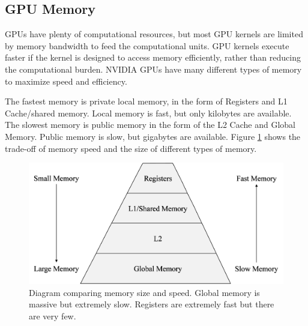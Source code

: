 \subsection{GPU Memory}
\label{sec:GPU_memory}
GPUs have plenty of computational resources, but most GPU kernels are limited by memory bandwidth to feed the computational units.
GPU kernels execute faster if the kernel is designed to access memory efficiently, rather than reducing the computational burden.
NVIDIA GPUs have many different types of memory to maximize speed and efficiency.

The fastest memory is private local memory,
in the form of Registers and L1 Cache/shared memory.
Local memory is fast, but only kilobytes are available.
The slowest memory is public memory in the form of the L2 Cache and Global Memory.
Public memory is slow, but gigabytes are available.
Figure \ref{fig:MemoryPyramid} shows the trade-off of memory speed and the size of different types of memory.
\begin{figure}
	\centering\includegraphics[width=8.36in/100*55]{figures/gpu_intro/MemoryPyramid.pdf}
	\caption{Diagram comparing memory size and speed. Global memory is massive but extremely slow. Registers are extremely fast but there are very few.}
	\label{fig:MemoryPyramid}
\end{figure}

